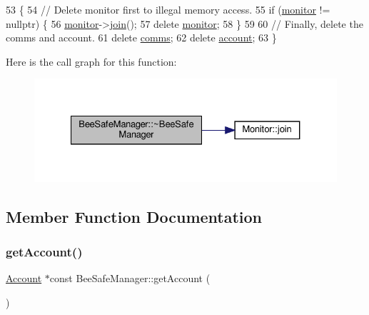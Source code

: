 \begin{DoxyCode}
53 \{
54     \textcolor{comment}{// Delete monitor first to illegal memory access.}
55     \textcolor{keywordflow}{if} (\hyperlink{class_bee_safe_manager_a3b885b4fb364228c914095f2e670f9af}{monitor} != \textcolor{keyword}{nullptr}) \{
56         \hyperlink{class_bee_safe_manager_a3b885b4fb364228c914095f2e670f9af}{monitor}->\hyperlink{class_monitor_a2d2e309666c98333a317c9786f94f6ad}{join}();
57         \textcolor{keyword}{delete} \hyperlink{class_bee_safe_manager_a3b885b4fb364228c914095f2e670f9af}{monitor};
58     \}
59 
60     \textcolor{comment}{// Finally, delete the comms and account.}
61     \textcolor{keyword}{delete} \hyperlink{class_bee_safe_manager_a80b19afbb679d08be14d67a45447f9e1}{comms};
62     \textcolor{keyword}{delete} \hyperlink{class_bee_safe_manager_a52bc9bc8c1ea9608b83d603b142443b0}{account};
63 \}
\end{DoxyCode}
Here is the call graph for this function\+:\nopagebreak
\begin{figure}[H]
\begin{center}
\leavevmode
\includegraphics[width=327pt]{d5/d75/class_bee_safe_manager_ac99fb148bcac3aa3f51e96fdf7bc0c1b_cgraph}
\end{center}
\end{figure}


\subsection{Member Function Documentation}
\mbox{\label{class_bee_safe_manager_a4052276ed4263cdbe715ce115e1ccee2}} 
\subsubsection{\texorpdfstring{get\+Account()}{getAccount()}}
{\footnotesize\ttfamily \hyperlink{class_account}{Account} $\ast$const Bee\+Safe\+Manager\+::get\+Account (\begin{DoxyParamCaption}{ }\end{DoxyParamCaption})}

